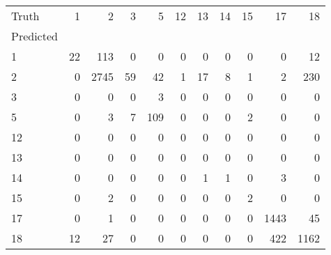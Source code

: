 \begin{tabular}{lrrrrrrrrrr}
\toprule
Truth & 1 & 2 & 3 & 5 & 12 & 13 & 14 & 15 & 17 & 18 \\
Predicted &  &  &  &  &  &  &  &  &  &  \\
\midrule
1 & 22 & 113 & 0 & 0 & 0 & 0 & 0 & 0 & 0 & 12 \\
2 & 0 & 2745 & 59 & 42 & 1 & 17 & 8 & 1 & 2 & 230 \\
3 & 0 & 0 & 0 & 3 & 0 & 0 & 0 & 0 & 0 & 0 \\
5 & 0 & 3 & 7 & 109 & 0 & 0 & 0 & 2 & 0 & 0 \\
12 & 0 & 0 & 0 & 0 & 0 & 0 & 0 & 0 & 0 & 0 \\
13 & 0 & 0 & 0 & 0 & 0 & 0 & 0 & 0 & 0 & 0 \\
14 & 0 & 0 & 0 & 0 & 0 & 1 & 1 & 0 & 3 & 0 \\
15 & 0 & 2 & 0 & 0 & 0 & 0 & 0 & 2 & 0 & 0 \\
17 & 0 & 1 & 0 & 0 & 0 & 0 & 0 & 0 & 1443 & 45 \\
18 & 12 & 27 & 0 & 0 & 0 & 0 & 0 & 0 & 422 & 1162 \\
\bottomrule
\end{tabular}
